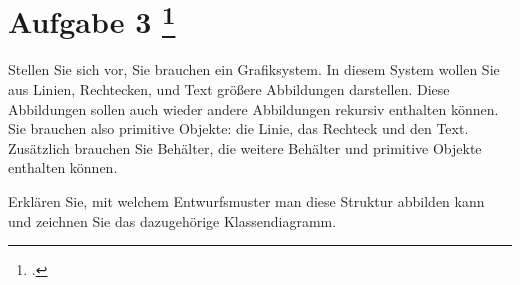 \documentclass{lehramt-informatik-aufgabe}
\begin{document}

\section{Aufgabe 3
\footcite{sosy:ab:6}}

Stellen Sie sich vor, Sie brauchen ein Grafiksystem. In diesem System
wollen Sie aus Linien, Rechtecken, und Text größere Abbildungen
darstellen. Diese Abbildungen sollen auch wieder andere Abbildungen
rekursiv enthalten können. Sie brauchen also primitive Objekte: die
Linie, das Rechteck und den Text. Zusätzlich brauchen Sie Behälter, die
weitere Behälter und primitive Objekte enthalten können.

Erklären Sie, mit welchem Entwurfsmuster man diese Struktur abbilden
kann und zeichnen Sie das dazugehörige Klassendiagramm.
\end{document}
